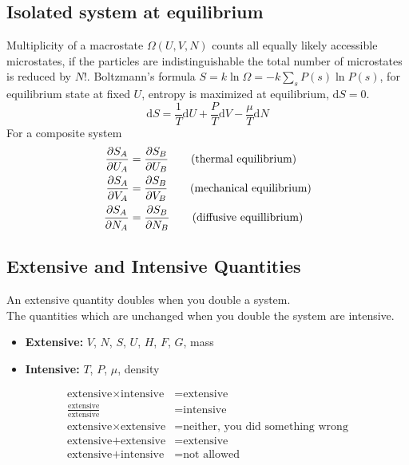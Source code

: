 \documentclass[a4paper, norsk, 8pt]{article}
\begin{document}
\begin{multicols*}{3}
\subsection*{\footnotesize  Isolated system at equilibrium}
Multiplicity of a macrostate $\Omega(U,V,N)$ counts all equally likely accessible microstates, if the particles are indistinguishable the total number of microstates is reduced by $N!$. Boltzmann's formula $S=k\ln{\Omega} = -k\sum_{s}P(s)\ln{P(s)}$, for equilibrium state at fixed $U$, entropy is maximized at equilibrium, $\mbox{d}S=0$.
\begin{equation*}
    \mbox{d}S = \frac{1}{T}\mbox{d}U  + \frac{P}{T}\mbox{d}V - \frac{\mu}{T}\mbox{d}N
\end{equation*}
For a composite system
\begin{align*}
  \pdv{S_A}{U_A} &= \pdv{S_B}{U_B} \qquad (\text{thermal equilibrium}) \\
  \pdv{S_A}{V_A} &= \pdv{S_B}{V_B} \qquad (\text{mechanical equilibrium}) \\
  \pdv{S_A}{N_A} &= \pdv{S_B}{N_B} \qquad (\text{diffusive equillibrium})
\end{align*}

\subsection*{\footnotesize  Extensive and Intensive Quantities}
An extensive quantity doubles when you double a system.\\
The quantities which are unchanged when you double the system are intensive.
\begin{itemize}
    \item \textbf{Extensive:} $V$, $N$, $S$, $U$, $H$, $F$, $G$, mass
    \item \textbf{Intensive:} $T$, $P$, $\mu$, density
\end{itemize}
\begin{align*}
    \text{extensive} \times \text{intensive} &= \text{extensive} \\
     \frac{\text{extensive}}{\text{extensive}} &= \text{intensive} \\
     \text{extensive} \times \text{extensive} &= \text{neither, you did something wrong} \\
     \text{extensive} + \text{extensive} &= \text{extensive} \\
     \text{extensive} + \text{intensive} &= \text{not allowed}
\end{align*}



\end{multicols*}
\end{document}
